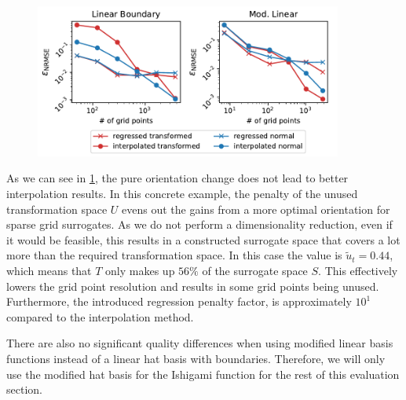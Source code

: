 \documentclass[
  a4paper,  %
  twoside,  %
  bibliography=totoc,
  headsepline,
  cleardoublepage=empty,
  parskip=half,
  draft=false
]{scrbook}
\begin{document}
\begin{mdframed}[style=style]
\vspace{-3mm}
\begin{figure}[H]
\centering
\includegraphics[width=0.9\textwidth]{graphics/ishigami_orientation}\vspace{-4mm}
\delimit
{}
\label{fig:ishigami_errors}
\end{figure}
\end{mdframed}
%
As we can see in \cref{fig:ishigami_errors}, the pure orientation change does not lead to better interpolation results.
In this concrete example, the penalty of the unused transformation space $U$ evens out the gains from a more optimal orientation for sparse grid surrogates.
As we do not perform a dimensionality reduction, even if it would be feasible, this results in a constructed surrogate space that covers a lot more than the required transformation space.
In this case the value is $\tilde{u}_t=0.44$, which means that $T$ only makes up $56\%$ of the surrogate space $S$.
This effectively lowers the grid point resolution and results in some grid points being unused.
Furthermore, the introduced regression penalty factor, is approximately $10^1$ compared to the interpolation method.

There are also no significant quality differences when using modified linear basis functions instead of a linear hat basis with boundaries.
Therefore, we will only use the modified hat basis for the Ishigami function for the rest of this evaluation section.
\end{document}
